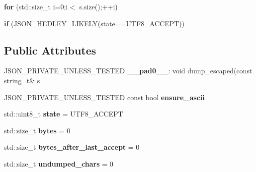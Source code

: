 \begin{DoxyCompactItemize}
\mbox{\label{classnlohmann_1_1detail_1_1serializer_ab14b8ec1f8102aa4c7e3c349f317654e}} 
{\bfseries for} (std\+::size\+\_\+t i=0;i$<$ s.\+size();++i)
\item 
\mbox{\label{classnlohmann_1_1detail_1_1serializer_a6705bbf2de3070ec50a810a32e72309f}} 
{\bfseries if} (J\+S\+O\+N\+\_\+\+H\+E\+D\+L\+E\+Y\+\_\+\+L\+I\+K\+E\+LY(state==U\+T\+F8\+\_\+\+A\+C\+C\+E\+PT))
\end{DoxyCompactItemize}
\subsection*{Public Attributes}
\begin{DoxyCompactItemize}
\item 
\mbox{\label{classnlohmann_1_1detail_1_1serializer_af15da74dab5b01150eabfed0be7d75df}} 
J\+S\+O\+N\+\_\+\+P\+R\+I\+V\+A\+T\+E\+\_\+\+U\+N\+L\+E\+S\+S\+\_\+\+T\+E\+S\+T\+ED {\bfseries \+\_\+\+\_\+pad0\+\_\+\+\_\+}\+: void dump\+\_\+escaped(const string\+\_\+t\& s
\item 
J\+S\+O\+N\+\_\+\+P\+R\+I\+V\+A\+T\+E\+\_\+\+U\+N\+L\+E\+S\+S\+\_\+\+T\+E\+S\+T\+ED const bool {\bfseries ensure\+\_\+ascii}
\item 
\mbox{\label{classnlohmann_1_1detail_1_1serializer_a39b0975f219b542d7ca633652e925b4c}} 
std\+::uint8\+\_\+t {\bfseries state} = U\+T\+F8\+\_\+\+A\+C\+C\+E\+PT
\item 
\mbox{\label{classnlohmann_1_1detail_1_1serializer_a4239a42672c7378a6b449ee010e6dace}} 
std\+::size\+\_\+t {\bfseries bytes} = 0
\item 
\mbox{\label{classnlohmann_1_1detail_1_1serializer_a9ae3daaea1941fd02d4c3c1b0f5fbe68}} 
std\+::size\+\_\+t {\bfseries bytes\+\_\+after\+\_\+last\+\_\+accept} = 0
\item 
\mbox{\label{classnlohmann_1_1detail_1_1serializer_a814f27bba20f0e109d0dbcaa4a399415}} 
std\+::size\+\_\+t {\bfseries undumped\+\_\+chars} = 0
\item 

\end{DoxyCompactItemize}
